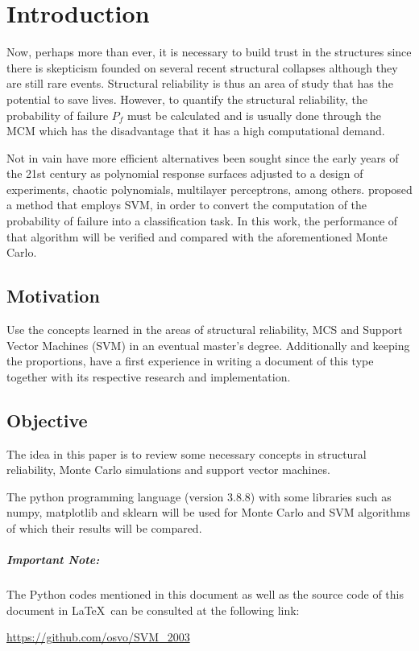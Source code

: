 \chapter{Introduction}\label{ch:introduction}

Now, perhaps more than ever, it is necessary to build trust in the structures since there is skepticism founded on several recent structural collapses although they are still rare events. Structural reliability is thus an area of study that has the potential to save lives. However, to quantify the structural reliability, the probability of failure \(P_f\) must be calculated and is usually done through the \ac{MCM} which has the disadvantage that it has a high computational demand.

Not in vain have more efficient alternatives been sought since the early years of the 21st century as polynomial response surfaces adjusted to a design of experiments, chaotic polynomials, multilayer perceptrons, among others.  \citep{Hurtado2003} proposed a method that employs \ac{SVM}, in order to convert the computation of the probability of failure into a classification task. In this work, the performance of that algorithm will be verified and compared with the aforementioned Monte Carlo.

\section{Motivation}\label{sec:motivation}

Use the concepts learned in the areas of structural reliability, \ac{MCS} and Support Vector Machines (\ac{SVM}) in an eventual master's degree. Additionally and keeping the proportions, have a first experience in writing a document of this type together with its respective research and implementation.

\section{Objective}

The idea in this paper is to review some necessary concepts in structural reliability, Monte Carlo simulations and support vector machines.

The python programming language (version 3.8.8) with some libraries such as numpy, matplotlib and sklearn will be used for Monte Carlo and \ac{SVM} algorithms of which their results will be compared.

\hfill

\vfill


\paragraph{Important Note:} The Python codes mentioned in this document as well as the source code of this document in \LaTeX\ can be consulted at the following link:
\begin{center}
	\faGithub \hspace{0.5cm}\url{https://github.com/osvo/SVM_2003}
\end{center}

